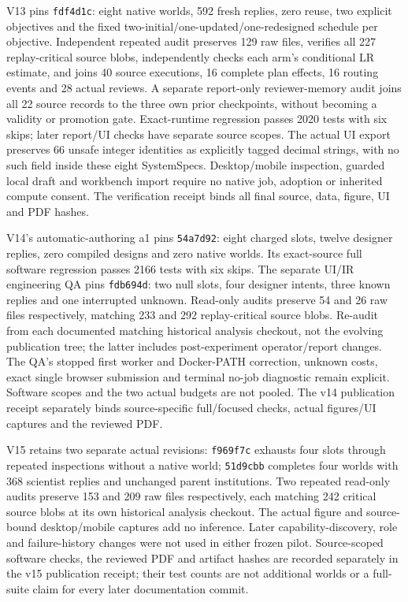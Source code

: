 \documentclass{article}
\newcommand{\code}[1]{\texttt{#1}}
\begin{document}
V13 pins \code{fdf4d1c}: eight native worlds, 592 fresh replies, zero reuse,
two explicit objectives and the fixed two-initial/one-updated/one-redesigned
schedule per objective. Independent repeated audit preserves 129 raw files,
verifies all 227 replay-critical source blobs, independently checks each
arm's conditional LR estimate, and joins 40 source executions, 16 complete
plan effects, 16 routing events and 28 actual reviews. A separate report-only
reviewer-memory audit joins all 22 source records to the three own prior
checkpoints, without becoming a validity or promotion gate. Exact-runtime
regression passes 2020 tests with six skips; later report/UI checks have
separate source scopes. The actual UI export preserves 66 unsafe integer
identities as explicitly tagged decimal strings, with no such field inside
these eight SystemSpecs. Desktop/mobile inspection, guarded local draft and
workbench import require no native job, adoption or inherited compute consent.
The verification receipt binds all final source, data, figure, UI and PDF hashes.

V14's automatic-authoring a1 pins \code{54a7d92}: eight charged slots,
twelve designer replies, zero compiled designs and zero native worlds.
Its exact-source full software regression passes 2166 tests with six skips.
The separate UI/IR engineering QA pins \code{fdb694d}: two null slots,
four designer intents, three known replies and one interrupted unknown.
Read-only audits preserve 54 and 26 raw files respectively, matching 233 and 292
replay-critical source blobs. Re-audit from each documented matching historical
analysis checkout, not the evolving publication tree; the latter includes
post-experiment operator/report changes. The QA's stopped first worker and
Docker-PATH correction, unknown costs, exact single browser submission and
terminal no-job diagnostic remain explicit. Software scopes and the two actual
budgets are not pooled. The v14 publication receipt separately binds source-specific
full/focused checks, actual figures/UI captures and the reviewed PDF.

V15 retains two separate actual revisions: \code{f969f7c} exhausts four slots
through repeated inspections without a native world; \code{51d9cbb} completes
four worlds with 368 scientist replies and unchanged parent institutions.
Two repeated read-only audits preserve 153 and 209 raw files respectively,
each matching 242 critical source blobs at its own historical analysis checkout.
The actual figure and source-bound desktop/mobile captures add no inference.
Later capability-discovery, role and failure-history changes were not used in
either frozen pilot. Source-scoped software checks, the reviewed PDF and
artifact hashes are recorded separately in the v15 publication receipt;
their test counts are not additional worlds or a full-suite claim for every
later documentation commit.
\end{document}
